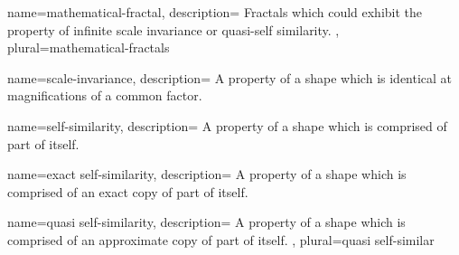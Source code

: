 {
    name={mathematical-fractal},
    description={
        Fractals which could exhibit the property of infinite scale invariance or
        quasi-self similarity.
    },
    plural={mathematical-fractals}
}

{
    name={scale-invariance},
    description={
        A property of a shape which is identical at magnifications of a common factor.
    }
}

{
    name={self-similarity},
    description={
        A property of a shape which is comprised of part of itself.
    }
}

{
    name={exact self-similarity},
    description={
        A property of a shape which is comprised of an exact copy of part of itself.
    }
}

{
    name={quasi self-similarity},
    description={
        A property of a shape which is comprised of an approximate copy of part of itself.
    },
    plural={quasi self-similar}
}

